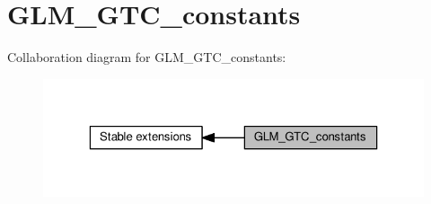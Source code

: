 \hypertarget{group__gtc__constants}{}\section{G\+L\+M\+\_\+\+G\+T\+C\+\_\+constants}
\label{group__gtc__constants}
Collaboration diagram for G\+L\+M\+\_\+\+G\+T\+C\+\_\+constants\+:
\nopagebreak
\begin{figure}[H]
\begin{center}
\leavevmode
\includegraphics[width=323pt]{d7/d6f/group__gtc__constants}
\end{center}
\end{figure}
